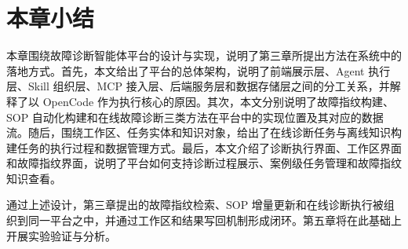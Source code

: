 
\section{本章小结}

本章围绕故障诊断智能体平台的设计与实现，说明了第三章所提出方法在系统中的落地方式。首先，本文给出了平台的总体架构，说明了前端展示层、Agent 执行层、Skill 组织层、MCP 接入层、后端服务层和数据存储层之间的分工关系，并解释了以 OpenCode 作为执行核心的原因。其次，本文分别说明了故障指纹构建、SOP 自动化构建和在线故障诊断三类方法在平台中的实现位置及其对应的数据流。随后，围绕工作区、任务实体和知识对象，给出了在线诊断任务与离线知识构建任务的执行过程和数据管理方式。最后，本文介绍了诊断执行界面、工作区界面和故障指纹界面，说明了平台如何支持诊断过程展示、案例级任务管理和故障指纹知识查看。

通过上述设计，第三章提出的故障指纹检索、SOP 增量更新和在线诊断执行被组织到同一平台之中，并通过工作区和结果写回机制形成闭环。第五章将在此基础上开展实验验证与分析。